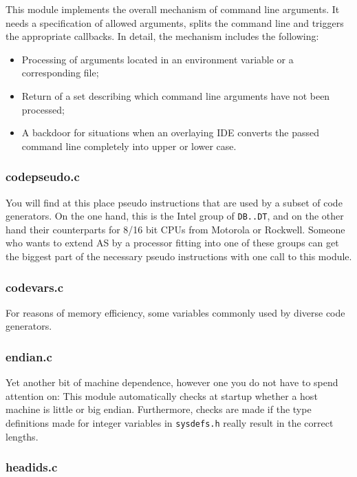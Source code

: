 \documentclass[12pt,twoside]{report}
\newcommand{\tty}[1]{{\tt #1}}
\begin{document}
This module implements the overall mechanism of command line arguments.
It needs a specification of allowed arguments, splits the command line and
triggers the appropriate callbacks.   In detail, the mechanism includes
the following:
\begin{itemize}
\item{Processing of arguments located in an environment variable or
      a corresponding file;}
\item{Return of a set describing which command line arguments have not
      been processed;}
\item{A backdoor for situations when an overlaying IDE converts the passed
      command line completely into upper or lower case.}
\end{itemize}

\subsubsection{codepseudo.c}

You will find at this place pseudo instructions that are used by
a subset of code generators.  On the one hand, this is the Intel group of
\tty{DB..DT}, and on the other hand their counterparts for 8/16 bit CPUs
from Motorola or Rockwell.  Someone who wants to extend AS by a
processor fitting into one of these groups can get the biggest part
of the necessary pseudo instructions with one call to this module.

\subsubsection{codevars.c}

For reasons of memory efficiency, some variables commonly used by diverse
code generators.

\subsubsection{endian.c}

Yet another bit of machine dependence, however one you do not have to
spend attention on: This module automatically checks at startup whether
a host machine is little or big endian.  Furthermore, checks are made if
the type definitions made for integer variables in {\tt sysdefs.h} really
result in the correct lengths.

\subsubsection{headids.c}
\end{document}
